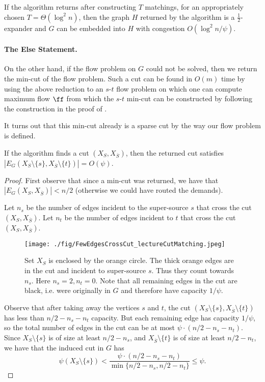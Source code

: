 \begin{lemma}
If the algorithm returns after constructing $T$ matchings, for an appropriately chosen $T = \Theta(\log^2 n)$, then the graph $H$ returned by the algorithm is a $\frac{1}{2}$-expander and $G$ can be embedded into $H$ with congestion $O(\log^2 n/ \psi)$.
\end{lemma}

\paragraph{The Else Statement.} On the other hand, if the flow problem on $G$ could not be solved, then we return the min-cut of the flow problem. Such a cut can be found in $O(m)$ time by using the above reduction to an $s$-$t$ flow problem on which one can compute maximum flow $\ff$ from which the $s$-$t$ min-cut can be constructed by following the construction in the proof of .

It turns out that this min-cut already is a sparse cut by the way our flow problem is defined.

\begin{lemma}
If the algorithm finds a cut $(X_S, X_{\overline{S}})$, then the returned cut satisfies $|E_G(X_S \setminus \{s\}, X_{\overline{S}} \setminus \{t\})| = O(\psi)$.
\end{lemma}
\begin{proof}
First observe that since a min-cut was returned, we have that $|E_G(X_S, X_{\overline{S}})| < n/2$ (otherwise we could have routed the demands).

Let $n_s$ be the number of edges incident to the super-source $s$ that cross the cut $(X_S, X_{\overline{S}})$. Let $n_t$ be the number of edges incident to $t$ that cross the cut $(X_S, X_{\overline{S}})$.

\begin{figure}[!ht]
    \centering
    \texttt{[image: ./fig/FewEdgesCrossCut\_lectureCutMatching.jpeg]}
    \caption{Set $X_S$ is enclosed by the orange circle. The thick orange edges are in the cut and incident to super-source $s$. Thus they count towards $n_s$. Here $n_s = 2, n_t = 0$. Note that all remaining edges in the cut are black, i.e. were originally in $G$ and therefore have capacity $1/\psi$.}
    \label{fig:my_label}
\end{figure}

Observe that after taking away the vertices $s$ and $t$, the cut $(X_S \setminus \{s\}, X_{\overline{S}} \setminus \{t\})$ has less than $n/2 - n_s - n_t$ capacity. But each remaining edge has capacity $1/\psi$, so the total number of edges in the cut can be at most $\psi \cdot (n/2 - n_s - n_t)$. Since $X_S \setminus \{s\}$ is of size at least $n/2-n_s$, and $X_{\overline{S}} \setminus \{t\}$ is of size at least $n/2-n_t$, we have that the induced cut in $G$ has
\[
    \psi(X_S \setminus \{s\}) < \frac{\psi \cdot (n/2 - n_s - n_t)}{\min\{ n/2 - n_s, n/2 - n_t\}} \leq \psi.
\]
\end{proof}

